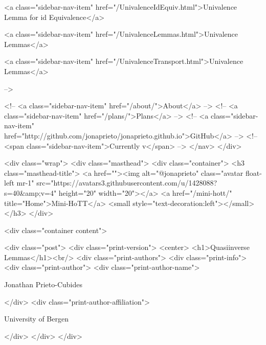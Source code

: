       
    
      
        
          <a class="sidebar-nav-item" href="/UnivalenceIdEquiv.html">Univalence Lemma for id Equivalence</a>
        
      
    
      
        
          <a class="sidebar-nav-item" href="/UnivalenceLemmas.html">Univalence Lemmas</a>
        
      
    
      
        
          <a class="sidebar-nav-item" href="/UnivalenceTransport.html">Univalence Lemmas</a>
        
      
     -->

    <!-- <a class="sidebar-nav-item" href="/about/">About</a> -->
    <!-- <a class="sidebar-nav-item" href="/plans/">Plans</a> -->
    <!-- <a class="sidebar-nav-item" href="http://github.com/jonaprieto/jonaprieto.github.io">GitHub</a> -->
    <!-- <span class="sidebar-nav-item">Currently v</span> -->
  </nav>
</div>

    <div class="wrap">
      <div class="masthead">
        <div class="container">
          <h3 class="masthead-title">
            <a href=""><img alt="@jonaprieto" class="avatar float-left mr-1" src="https://avatars3.githubusercontent.com/u/1428088?s=40&amp;v=4" height="20" width="20"></a>
            <a href="/mini-hott/" title="Home">Mini-HoTT</a>
            <small style="text-decoration:left"></small>
          </h3>
        </div>
      
      <div class="container content">
        







<div class="post">
  <div class="print-version">
    <center>
      <h1>Quasiinverse Lemmas</h1><br/>
        <div class="print-authors">
          <div class="print-info">
            <div class="print-author">
              <div class="print-author-name">
                
                  Jonathan Prieto-Cubides
                
              </div>
              <div class="print-author-affiliation">
                
                  University of Bergen
                
                </div>
            </div>
          </div>
          
